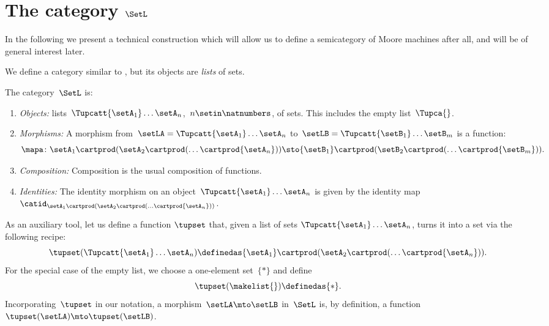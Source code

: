 
\section{The category $\SetL$}
\label{sec:SetL}

In the following we present a technical construction which will allow us to define a semicategory of Moore machines after all, and will be of general interest later.

We define a category similar to \Set, but its objects are \emph{lists} of sets.

\begin{definition}
    \label{def:SetL}
    The category~$\SetL$ is:
    \begin{enumerate}
        \item \emph{Objects:} lists~$\Tupcatt {\setA_1}  \dots {\setA_n}$,~$n \setin \natnumbers$, of sets.
              This includes the empty list~$\Tupca {}$.
        \item \emph{Morphisms:}
              A morphism from~$\setLA =\Tupcatt {\setA_1}  \dots {\setA_n}$ to~$\setLB = \Tupcatt {\setB_1} \dots {\setB_m}$ is a function:
              \begin{equation*}
                  \mapa\colon {\setA_1} \cartprod (\setA_2 \cartprod (\ldots \cartprod {\setA_n})) \sto {\setB_1} \cartprod (\setB_2 \cartprod (\ldots \cartprod {\setB_m})).
              \end{equation*}
        \item \emph{Composition:}
              Composition is the usual composition of functions.
        \item \emph{Identities:}
              The identity morphism on an object~$\Tupcatt {\setA_1} \dots {\setA_n}$ is given by the identity map~$\catid_{{\setA_1} \cartprod (\setA_2 \cartprod (\ldots \cartprod {\setA_n}))}$.
    \end{enumerate}
\end{definition}

As an auxiliary tool, let us define a function $\tupset$ that, given a list of sets $\Tupcatt {\setA_1}  \dots {\setA_n}$, turns it into a set via the following recipe:
\begin{equation*}
    \tupset (\Tupcatt {\setA_1}  \dots {\setA_n}) \definedas {\setA_1} \cartprod (\setA_2 \cartprod (\ldots \cartprod {\setA_n})).
\end{equation*}
For the special case of the empty list, we choose a one-element set~$\{*\}$ and define
\begin{equation*}
    \tupset (\makelist{}) \definedas \{*\}.
\end{equation*}
Incorporating~$\tupset$ in our notation, a morphism~$\setLA \mto \setLB$ in~$\SetL$ is, by definition, a function~$\tupset(\setLA) \mto \tupset(\setLB)$.

